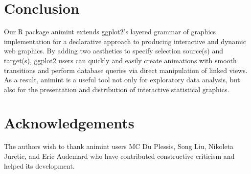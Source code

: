 \documentclass[12pt]{article}\usepackage[]{graphicx}\usepackage[]{color}
\begin{document}
\section{Conclusion}

Our R package animint extends ggplot2's layered grammar of graphics 
implementation for a declarative approach to producing interactive
and dynamic web graphics. By adding two aesthetics to specify selection
source(s) and target(s), ggplot2 users can quickly and easily create 
animations with smooth transitions and perform database queries via direct
manipulation of linked views. As a result, animint is a useful tool 
not only for exploratory data analysis, but also for the presentation
and distribution of interactive statistical graphics.

\section*{Acknowledgements}

The authors wish to thank animint users MC Du Plessis, Song Liu,
Nikoleta Juretic, and Eric Audemard
who have contributed constructive criticism and helped its development.

%



\end{document}
